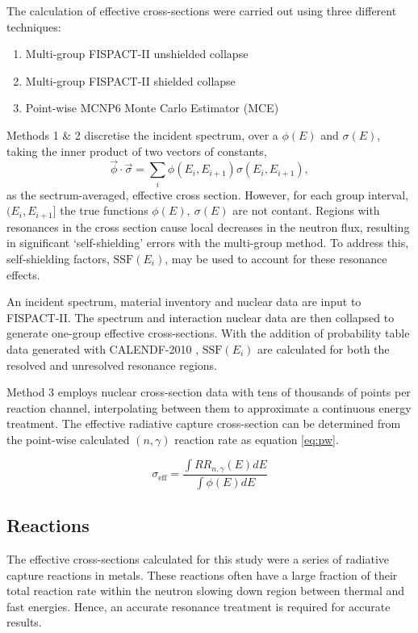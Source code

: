The calculation of effective cross-sections were carried out using three different techniques:
\begin{enumerate}
\item Multi-group FISPACT-II unshielded collapse
\item Multi-group FISPACT-II shielded collapse
\item Point-wise MCNP6 Monte Carlo Estimator (MCE)
\end{enumerate}

Methods 1 \& 2 discretise the incident spectrum, over a  $\phi(E)$ and $\sigma(E)$, taking the inner product of two vectors of constants,
$$\vec{\phi} \cdot \vec{\sigma} = \sum_i \phi(E_i , E_{i+1}) \sigma(E_i , E_{i+1}),$$
as the sectrum-averaged, effective cross section. However, for each group interval, $(E_{i}, E_{i+1}]$ the true functions $\phi(E),\ \sigma(E)$ are not contant. Regions with resonances in the cross section cause local decreases in the neutron flux, resulting in significant `self-shielding' errors with the multi-group method. To address this, self-shielding factors, $\mathrm{SSF}(E_i)$, may be used to account for these resonance effects. 

An incident spectrum, material inventory and nuclear data are input to FISPACT-II. The spectrum and interaction nuclear data are then collapsed to generate one-group effective cross-sections. With the addition of probability table data generated with CALENDF-2010 \cite{sublet2011}, $\mathrm{SSF}(E_i)$ are calculated for both the resolved and unresolved resonance regions.

Method 3 employs nuclear cross-section data with tens of thousands of points per reaction channel, interpolating between them to approximate a continuous energy treatment. The effective radiative capture cross-section can be determined from the point-wise calculated $(n,\gamma)$ reaction rate as equation \ref{eq:pw}. 

\begin{equation}
\label{eq:pw}
\sigma_\mathrm{eff} = \frac{\int RR_{n,\gamma}(E) dE}{\int \phi(E) dE}
\end{equation}

\subsection{Reactions}

The effective cross-sections calculated for this study were a series of radiative capture reactions in metals. These reactions often have a large fraction of their total reaction rate within the neutron slowing down region between thermal and fast energies. Hence, an accurate resonance treatment is required for accurate results. 

